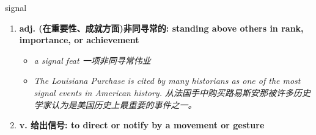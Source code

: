 
\begin{frame}
{\huge signal}
\begin{center}
\begin{enumerate}\Large
  \item \textbf{adj. (在重要性、成就方面)非同寻常的: standing above others in rank, importance, or achievement}
  \begin{itemize}
    \item \em{\Large{a signal feat 一项非同寻常伟业}}
    \item \em{\Large{The Louisiana Purchase is cited by many historians as one of the most signal events in American history. 从法国手中购买路易斯安那被许多历史学家认为是美国历史上最重要的事件之一。}}
  \end{itemize}
  \item \textbf{v. 给出信号: to direct or notify by a movement or gesture}
\end{enumerate}
\end{center}
\end{frame}
